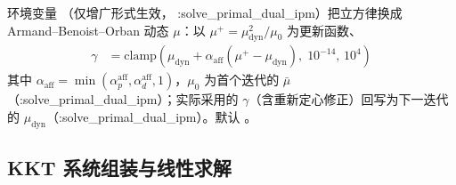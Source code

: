 环境变量 （仅增广形式生效，
:solve\_primal\_dual\_ipm）把立方律换成 Armand--Benoist--Orban 动态 $\mu$：以
$\mu^{+}=\mu_{\mathrm{dyn}}^{2}/\mu_0$ 为更新函数、
\begin{align*}
\gamma &= \mathrm{clamp}\!\left(
\mu_{\mathrm{dyn}} + \alpha_{\mathrm{aff}}(\mu^{+}-\mu_{\mathrm{dyn}}),
\;10^{-14},\,10^{4}\right)
\end{align*}
其中 $\alpha_{\mathrm{aff}}=\min(\alpha_p^{\mathrm{aff}},
\alpha_d^{\mathrm{aff}},1)$，$\mu_0$ 为首个迭代的 $\bar\mu$
（:solve\_primal\_dual\_ipm）；实际采用的 $\gamma$（含重新定心修正）回写为下一迭代的
$\mu_{\mathrm{dyn}}$（:solve\_primal\_dual\_ipm）。默认 。

\subsection{KKT 系统组装与线性求解}\label{subsec:pipm-kkt}

